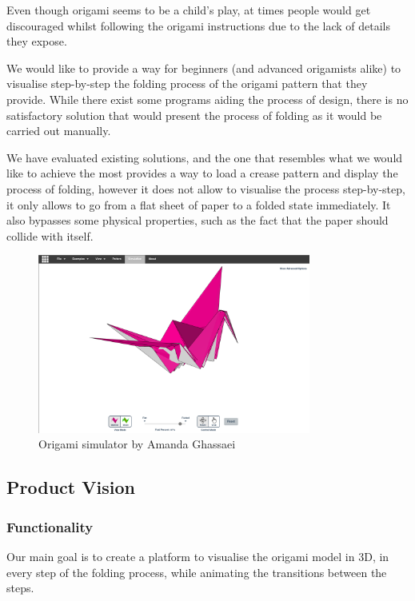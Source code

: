 Even though origami seems to be a child's play, at times
people would get discouraged whilst following the origami instructions due to
the lack of details they expose.

We would like to provide a way for beginners (and advanced origamists alike) to visualise step-by-step the folding process of the origami pattern that they provide.
While there exist some programs aiding the process of design, there is no satisfactory solution
that would present the process of folding as it would be carried out manually.

We have evaluated existing solutions, and the one that resembles 
what we would like to achieve the most \cite{origami-simulator} provides a way to load a crease pattern
and display the process of folding, however it does not allow to visualise the process step-by-step, it only allows 
to go from a flat sheet of paper to a folded state immediately. It also bypasses some physical properties, such as the fact that the
paper should collide with itself.


\begin{figure}[H]
\caption{Origami simulator by Amanda Ghassaei}
  \centering
    \includegraphics[width=0.8\textwidth]{assets/origami-simulator.png}
\end{figure}

\subsection{Product Vision}

\subsubsection{Functionality}

Our main goal is to create a platform to visualise the origami model in 3D,
in every step of the folding process, while animating the transitions between the steps.

